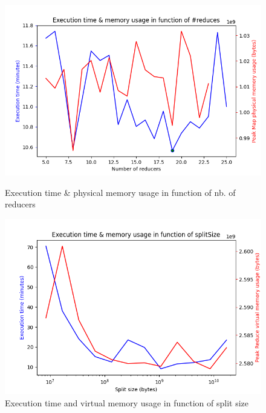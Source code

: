 \documentclass[11pt]{article}
\begin{document}
\begin{figure}
\begin{minipage}{.48\textwidth}
		\includegraphics[width=1.1\textwidth]{./img/ExecutionReduceMemoryVSMaps.png}
		\caption{Execution time \& physical memory usage in function of nb. of reducers}
		\label{fig:nbReducers}
\end{minipage}\hfill
\begin{minipage}{.48\textwidth}
	\includegraphics[width=1.1\textwidth]{./img/ExecutionReducerVirtMemoryVSMaps.png}
	\caption{Execution time and virtual memory usage in function of split size}
	\label{fig:splitSize}
\end{minipage}
\end{figure}
\end{document}
